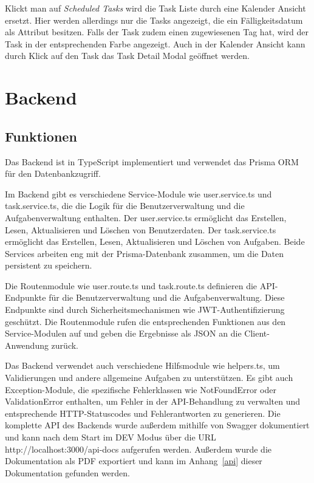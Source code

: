 \documentclass[a4paper, 12pt]{article}
\begin{document}
    Klickt man auf {\it Scheduled Tasks} wird die Task Liste durch eine Kalender Ansicht ersetzt. Hier werden allerdings
    nur die Tasks angezeigt, die ein Fälligkeitsdatum als Attribut besitzen. Falls der Task zudem einen zugewiesenen Tag
    hat, wird der Task in der entsprechenden Farbe angezeigt. Auch in der Kalender Ansicht kann durch Klick auf den Task
    das Task Detail Modal geöffnet werden.


    \section{Backend}
    \subsection{Funktionen}

    Das Backend ist in TypeScript implementiert und verwendet das Prisma ORM für den Datenbankzugriff.

    Im Backend gibt es verschiedene Service-Module wie user.service.ts und task.service.ts, die die Logik für die
    Benutzerverwaltung und die Aufgabenverwaltung enthalten. Der user.service.ts ermöglicht das Erstellen, Lesen,
    Aktualisieren und Löschen von Benutzerdaten. Der task.service.ts ermöglicht das Erstellen, Lesen, Aktualisieren und
    Löschen von Aufgaben. Beide Services arbeiten eng mit der Prisma-Datenbank zusammen, um die Daten persistent zu
    speichern.

    Die Routenmodule wie user.route.ts und task.route.ts definieren die API-Endpunkte für die Benutzerverwaltung und die
    Aufgabenverwaltung. Diese Endpunkte sind durch Sicherheitsmechanismen wie JWT-Authentifizierung geschützt. Die
    Routenmodule rufen die entsprechenden Funktionen aus den Service-Modulen auf und geben die Ergebnisse als JSON an die
    Client-Anwendung zurück.

    Das Backend verwendet auch verschiedene Hilfsmodule wie helpers.ts, um Validierungen und andere allgemeine Aufgaben zu
    unterstützen. Es gibt auch Exception-Module, die spezifische Fehlerklassen wie NotFoundError oder ValidationError
    enthalten, um Fehler in der API-Behandlung zu verwalten und entsprechende HTTP-Statuscodes und Fehlerantworten zu
    generieren. Die komplette API des Backends wurde außerdem mithilfe von Swagger dokumentiert und kann nach dem Start
    im DEV Modus über die URL http://localhost:3000/api-docs aufgerufen werden. Außerdem wurde die Dokumentation als
    PDF exportiert und kann im Anhang~\ref{api} dieser Dokumentation gefunden werden.
\end{document}
